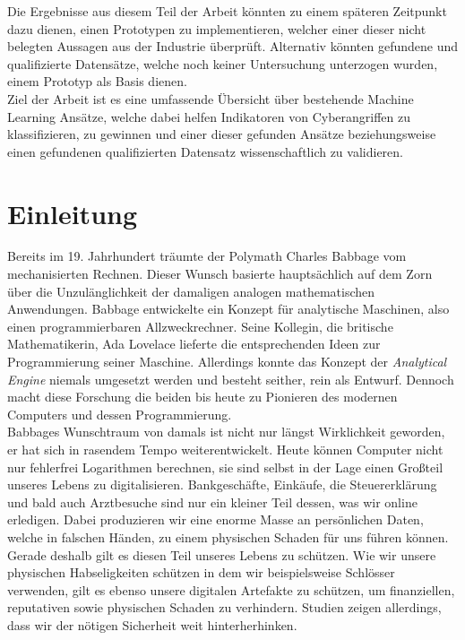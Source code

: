 \documentclass[
    12pt, %
    DIV10,
    ngerman, %
    a4paper, %
    oneside, %
    titlepage, %
    parskip=half, %
    headings=normal, %
    listof=totoc, %
    bibliography=totoc, %
    index=totoc, %
    captions=tableheading, %
    final %
]{scrreprt}
\def\mainmatter{%
    \pagenumbering{arabic}
    \setcounter{page}{1}
    \setcounter{section}{0}
    \renewcommand{\thesection}{\arabic{section}}
}%
\begin{document}
Die Ergebnisse aus diesem Teil der Arbeit könnten zu einem späteren Zeitpunkt dazu dienen, einen Prototypen zu implementieren, welcher einer dieser nicht belegten Aussagen aus der Industrie überprüft.
Alternativ könnten gefundene und qualifizierte Datensätze, welche noch keiner Untersuchung unterzogen wurden, einem Prototyp als Basis dienen.\\
\noindent Ziel der Arbeit ist es eine umfassende Übersicht über bestehende Machine Learning Ansätze, welche dabei helfen Indikatoren von Cyberangriffen zu klassifizieren, zu gewinnen und einer dieser gefunden Ansätze beziehungsweise einen gefundenen qualifizierten Datensatz wissenschaftlich zu validieren. 
\newpage
\tableofcontents
\mainmatter
\newpage
\chapter{Einleitung}
Bereits im 19. Jahrhundert träumte der Polymath Charles Babbage vom mechanisierten Rechnen. Dieser Wunsch basierte hauptsächlich auf dem Zorn über die Unzulänglichkeit der damaligen analogen mathematischen Anwendungen. Babbage entwickelte ein Konzept für analytische Maschinen, also einen programmierbaren Allzweckrechner. Seine Kollegin, die britische Mathematikerin, Ada Lovelace lieferte die entsprechenden Ideen zur Programmierung seiner Maschine. Allerdings konnte das Konzept der \emph{Analytical Engine} niemals umgesetzt werden und besteht seither, rein als Entwurf. Dennoch macht diese Forschung die beiden bis heute zu Pionieren des modernen Computers und dessen Programmierung.\\
Babbages Wunschtraum von damals ist nicht nur längst Wirklichkeit geworden, er hat sich in rasendem Tempo weiterentwickelt. Heute können Computer nicht nur fehlerfrei Logarithmen berechnen, sie sind selbst in der Lage einen Großteil unseres Lebens zu digitalisieren. Bankgeschäfte, Einkäufe, die Steuererklärung und bald auch Arztbesuche sind nur ein kleiner Teil dessen, was wir online erledigen. Dabei produzieren wir eine enorme Masse an persönlichen Daten, welche in falschen Händen, zu einem physischen Schaden für uns führen können. Gerade deshalb gilt es diesen Teil unseres Lebens zu schützen. Wie wir unsere physischen Habseligkeiten schützen in dem wir beispielsweise Schlösser verwenden, gilt es ebenso unsere digitalen Artefakte zu schützen, um finanziellen, reputativen sowie physischen Schaden zu verhindern. Studien zeigen allerdings, dass wir der nötigen Sicherheit weit hinterherhinken. 
\end{document}
